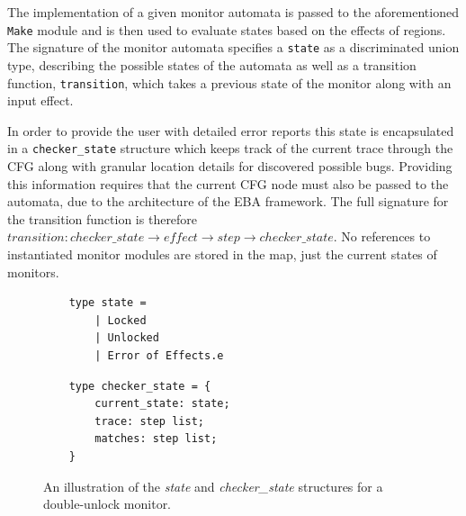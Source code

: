 
\newpar The implementation of a given monitor automata is passed to the aforementioned \texttt{Make} module and is then used to evaluate states based on the effects of regions. The signature of the monitor automata specifies a \texttt{state} as a discriminated union type, describing the possible states of the automata as well as a transition function, \texttt{transition}, which takes a previous state of the monitor along with an input effect. 

\newpar In order to provide the user with detailed error reports this state is encapsulated in a \texttt{checker\_state} structure which keeps track of the current trace through the CFG along with granular location details for discovered possible bugs. Providing this information requires that the current CFG node must also be passed to the automata, due to the architecture of the EBA framework. The full signature for the transition function is therefore $transition: \mathit{checker\_state} \rightarrow \mathit{effect} \rightarrow \mathit{step} \rightarrow \mathit{checker\_state}$. No references to instantiated monitor modules are stored in the map, just the current states of monitors. 

\begin{figure}[H]
    \centering
    \begin{minipage}[t]{0.45\textwidth}
    \begin{verbatim}
    type state = 
        | Locked
        | Unlocked
        | Error of Effects.e
    \end{verbatim}
    \end{minipage}
    \hspace*{0.05\textwidth}
    \begin{minipage}[t]{0.45\textwidth}
    \begin{verbatim}
    type checker_state = {
        current_state: state;
        trace: step list;
        matches: step list;
    }
    \end{verbatim}
    \end{minipage}
    \caption{An illustration of the \textit{state} and \textit{checker\_state} structures for a double-unlock monitor.}
    \label{checker-state}
    \end{figure}

